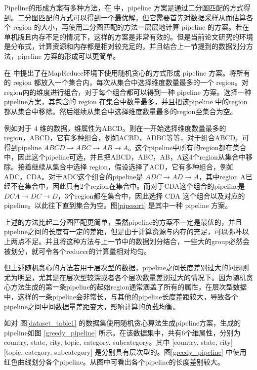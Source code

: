 Pipeline的形成方案有多种方法，在 \cite{agarwal1996computation} 中，pipeline 方案是通过二分图匹配的方式得到。二分图匹配的方式可以得到一个最优解，但它需要首先对数据采样从而估算各个 region 的大小，再使用二分图匹配的方法一层层地计算 pipeline 的方案。若在单机版且内存不足的情况下，这样的方案是非常有效的。但是当前论文研究的环境是分布式，计算资源和内存都是相对较充足的，并且结合上一节提到的数据划分方法，pipeline 方案的形成可以更简单。

在\cite{wang2013scalable} 中提出了在MapReduce环境下使用随机贪心的方式形成 pipeline 方案。将所有的 region 都放入一个集合内，每次从集合中选择维度数量最多的一个 region。对region内的维度进行组合，对于每个组合都可以得到一种 pipeline 方案。选择一种pipeline方案，其包含的 region 在集合中数量最多，并且把该pipeline 中的region都从集合中移除。然后继续从集合中选择维度数量最多的region至集合为空。

例如对于 4 维的数据，维属性为ABCD。则在一开始选择维度数量最多的 region，ABCD，它有多种组合，例如ACBD，ADBC等等，对于组合ABCD，可得到pipeline $ABCD\rightarrow ABC\rightarrow AB\rightarrow A$。这个pipeline中所有的region都在集合中，因此这个pipeline可选，并且把ABCD，ABC，AB，A这4个region从集合中移除。接着继续从集合中选择 region，假设选择了ACD，它有多种组合，例如ADC，CDA。对于ADC这个组合的pipeline是  $ADC\rightarrow AD\rightarrow A$，其中region A已经不在集合中，因此只有2个region在集合中。而对于CDA这个组合的pipeline是  $DCA\rightarrow DC\rightarrow D$，3个region都在集合中，因此选择 CDA 这个组合以及对应的pipeline。以此往下直到集合为空。图\ref{pipesort} 是其中一种 pipeline 方案。

上述的方法比起二分图匹配更简单，虽然pipeline的方案不一定是最优的，并且pipeline之间的长度有一定的差距，但是由于计算资源与内存的充足，可以弥补以上两点不足。并且将这种方法与上一节中的数据划分结合，一些大的group必然会被划分，就可令各个reducer的计算量相对均匀。

但上述随机贪心的方法若用于层次型的数据，pipeline之间长度差别过大的问题则尤为明显，尤其是在层次型较深或者各个层次数量差别过大的情况下。因为随机贪心方法生成的第一条pipeline的起始region通常涵盖了所有的属性，在层次型数据中，这样的一条pipeline会非常长，与其他的pipeline长度差距较大，导致各个pipeline之间中间数据量差距变大，影响计算的负载均衡。

如对 图\ref{dataset_table1} 的数据集使用随机贪心算法生成pipeline方案，生成的pipeline如图 \ref{greedy_pipeline} 所示。在该数据集中，共有6个维属性，分别为 country, state, city, topic, category, subcategory。其中 [country, state, city] [topic, category, subcategory] 是分别具有层次型的。图\ref{greedy_pipeline} 中使用红色曲线划分各个pipeline。从图中可看出各个pipeline的长度差别较大。

